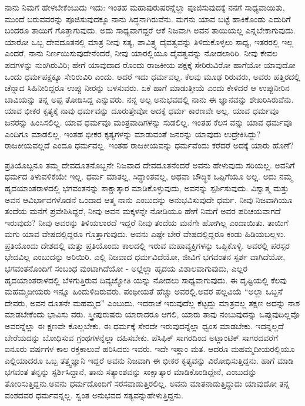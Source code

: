 ನಾನು ನಿಮಗೆ ಹೇಳಬೇಕೆಂಬುದು ಇದು: ಇಂತಹ ಮಹಾಪುರುಷರನ್ನೆಲ್ಲಾ ಪೂಜಿಸುವುದಕ್ಕೆ ನನಗೆ ಸಾಧ್ಯವಾಯಿತು, ಮುಂದೆ ಬರುವವರನ್ನು ಪೂಜಿಸುವುದಕ್ಕೂ ನಾನು ಸಿದ್ಧನಾಗಿರುವೆನು. ಮಗನು ಯಾವ ಬಟ್ಟೆ ಹಾಕಿಕೊಂಡು ಎದುರಿಗೆ ಬಂದರೂ ತಾಯಿಗೆ ಗೊತ್ತಾಗುವುದು. ಅದು ಸಾಧ್ಯವಾಗದ್ದರೆ ಆಕೆ ನಿಜವಾಗಿ ಅವನ ತಾಯಿಯಲ್ಲ ಎನ್ನಬೇಕಾಗುವುದು. ಯಾರೋ ಒಬ್ಬ ದೇವದೂತನಲ್ಲಿ ಮಾತ್ರ ನೀವು ಸತ್ಯ, ಪಾವಿತ್ರ್ಯ ದೈವತ್ವವನ್ನು ತಿಳಿದುಕೊಳ್ಳಲು ಸಾಧ್ಯ, ಇತರರಲ್ಲಿ ಇಲ್ಲ ಎಂದರೆ, ನಾನು ನಿರ್ಣಯಿಸುವುದೇನೆಂದರೆ, ನೀವು ಯಾರಲ್ಲಿಯೂ ದೈವತ್ವವನ್ನು ನೋಡಲಾರಿರಿ. ನೀವು ಕೇವಲ ಪದಗಳನ್ನು ನುಂಗಿರುವಿರಿ; ಹೇಗೆ ಯಾವುದಾದ ರೊಂದು ರಾಜಕೀಯ ಪಕ್ಷಕ್ಕೆ ಸೇರಿರುವಿರೋ ಹಾಗೆಯೋ ಯಾವುದೋ ಒಂದು ಧರ್ಮಪಕ್ಷಕ್ಕೂ ಸೇರಿರುವಿರಿ ಎಂದು. ಆದರೆ ಇದು ಧರ್ಮವಲ್ಲ. ಕೆಲವು ಮೂಢ ರಿರುವರು, ಅವರು ಹತ್ತಿರದಲ್ಲಿ ಚೆನ್ನಾದ ಸಿಹಿನೀರಿದ್ದರೂ ಉಪ್ಪು ನೀರನ್ನು ಬಳಸುವರು. ಏಕೆ ಹಾಗೆ ಮಾಡುತ್ತೀಯೆ ಎಂದು ಕೇಳಿದರೆ ಆ ಉಪ್ಪುನೀರಿನ ಬಾವಿಯನ್ನು ತನ್ನ ಅಪ್ಪ ತೋಡಿಸಿದ್ದ ಎನ್ನುವರು. ನನ್ನ ಅಲ್ಪ ಅನುಭವದಲ್ಲಿ ನಾನು ಈ ಜ್ಞಾನವನ್ನು ಶೇಖರಿಸಿರುವೆನು. ಯಾವ ಭೀಕರ ಕೃತ್ಯಕ್ಕೆ ನಾವು ಧರ್ಮವನ್ನು ದೂರುತ್ತೇವೋ ಅದಕ್ಕೆ ಧರ್ಮ ಕಾರಣವೇ ಅಲ್ಲ. ಯಾವ ಧರ್ಮವೂ ಜನರನ್ನು ಹಿಂಸಿಸಲಿಲ್ಲ. ಯಾವ ಧರ್ಮವೂ ಮಂತ್ರವಾದಿಗಳನ್ನು ಸುಡಲಿಲ್ಲ. ಇಂತಹ ಕೆಲಸ ವನ್ನು ಯಾವ ಧರ್ಮವೂ ಎಂದಿಗೂ ಮಾಡಲಿಲ್ಲ. ಇಂತಹ ಭೀಕರ ಕೃತ್ಯಗಳನ್ನು ಮಾಡುವಂತೆ ಜನರನ್ನು ಯಾವುದು ಉದ್ರೇಕಿಸಿದ್ದು? ರಾಜಕೀಯವಲ್ಲದೆ ಎಂದೂ ಧರ್ಮವಲ್ಲ. ಇಂತಹ ರಾಜಕೀಯವನ್ನು ಧರ್ಮವೆಂದು ಕರೆದರೆ ಅದಕ್ಕೆ ಯಾರು ಹೊಣೆ?

ಪ್ರತಿಯೊಬ್ಬನೂ ತಮ್ಮ ದೇವದೂತನೊಬ್ಬನೇ ನಿಜವಾದ ದೇವದೂತನೆಂದರೆ ಅವನು ಹೇಳುವುದು ಸರಿಯಲ್ಲ. ಅವನಿಗೆ ಧರ್ಮದ ತಿಳುವಳಿಕೆಯೇ ಇಲ್ಲ. ಧರ್ಮ ಮಾತಲ್ಲ, ಸಿದ್ಧಾಂತವಲ್ಲ, ಅಥವಾ ಬೌದ್ಧಿಕ ಒಪ್ಪಿಗೆಯೂ ಅಲ್ಲ. ಅದು ನಮ್ಮ ಹೃದಯಾಂತರಾಳದಲ್ಲಿ ಭಗವಂತನನ್ನು ಸಾಕ್ಷಾತ್ಕಾರ ಮಾಡಿಕೊಳ್ಳುವುದು, ಅವನನ್ನು ಸ್ಪರ್ಶಿಸುವುದು. ವಿಶ್ವಾತ್ಮ ಮತ್ತು ಅವನ ಆವಿರ್ಭಾವಗಳೊಡನೆ ಒಂದಾದ ಆತ್ಮ ನಾನು ಎಂಬುದನ್ನು ಅನುಭವಿಸುವುದೇ ಧರ್ಮ. ನೀವು ನಿಜವಾಗಿಯೂ ತಂದೆಯ ಮನೆಗೆ ಪ್ರವೇಶಿಸಿದ್ದರೆ, ನೀವು ಅವನ ಮಕ್ಕಳನ್ನೇ ನೋಡಿಯೂ ಹೇಗೆ ನಿಮಗೆ ಅವರ ಪರಿಚಯವಾಗದೆ ಇರುವುದು? ನೀವು ಅವರನ್ನು ತಿಳಿಯಲಾರದೆ ಇದ್ದರೆ ನೀವು ತಂದೆಯ ಮನೆಗೇ ಹೋಗಿಲ್ಲ ಎಂದಾಯಿತು. ತಾಯಿಗೆ ಮಗು ಯಾವ ವೇಷದಲ್ಲಿದ್ದರೂ ಗೊತ್ತಾಗುವುದು. ಅವನು ಎಷ್ಟೇ ಬೇರೆ ವೇಷದಲ್ಲಿದ್ದರೂ ಕಂಡು ಹಿಡಿಯಬಲ್ಲಳು. ಪ್ರತಿಯೊಂದು ದೇಶದಲ್ಲಿ ಮತ್ತು ಪ್ರತಿಯೊಂದು ಕಾಲದಲ್ಲಿ ಇರುವ ಮಹಾವ್ಯಕ್ತಿಗಳನ್ನು ಒಪ್ಪಿಕೊಳ್ಳಿ. ಅವರಲ್ಲಿ ಪರಸ್ಪರ ಭೇದವಿಲ್ಲ ಎಂಬುದನ್ನು ಅರಿಯಿರಿ. ಎಲ್ಲಿ ನಿಜವಾದ ಧರ್ಮವಿದೆಯೋ, ಜೀವಿಗೆ ಭಗವಂತನ ಸ್ಪರ್ಶ ವಾಗಿದೆಯೋ, ಭಗವಂತನೊಂದಿಗೆ ಸಂಬಂಧ ವುಂಟಾಗಿದೆಯೋ - ಅಲ್ಲೆಲ್ಲಾ ಹೃದಯ ವಿಶಾಲವಾಗುವುದು, ಎಲ್ಲರ ಹೃದಯಾಂತರಾಳದಲ್ಲಿ ಬೆಳಗುತ್ತಿರುವ ದಿವ್ಯಜ್ಯೋತಿ ಯನ್ನು ನೋಡಲು ಸಾಧ್ಯವಾಗುವುದು. ಈ ದೃಷ್ಟಿಯಲ್ಲಿ ಕೆಲವು ಮಹಮ್ಮದೀಯರು ಇನ್ನೂ ಹಿಂದುಳಿದಿರುವರು. ಪಂಥೀಯತೆ ಹೆಚ್ಚು ಅವರಲ್ಲಿ.ಅವರ ಪಲ್ಲವಿಯೆ “ಅಲ್ಲಾ ಒಬ್ಬನೆ ದೇವರು, ಅವನ ದೂತನೇ ಮಹಮ್ಮದ” ಎಂಬುದು. ಇದರಾಚೆ ಇರುವುದೆಲ್ಲ ಕೆಟ್ಟದ್ದು ಮಾತ್ರವಲ್ಲ ತಕ್ಷಣ ಅದನ್ನು ನಾಶ ಮಾಡಬೇಕೆಂದು ಭಾವಿಸು ವರು. ಸ್ತ್ರೀಪುರುಷರು ಯಾರಾದರೂ ಆಗಲಿ, ಯಾರು ತಾವು ನಂಬುವುದನ್ನು ಒಪ್ಪುವುದಿಲ್ಲವೊ ಅವರನ್ನೆಲ್ಲಾ ಈ ಕ್ಷಣವೇ ಕೊಲ್ಲಬೇಕು. ಈ ಧರ್ಮಕ್ಕೆ ಸೇರದೇ ಇರುವುದನ್ನೆಲ್ಲಾ ಧ್ವಂಸ ಮಾಡಬೇಕು. ಇದನ್ನಲ್ಲದೆ ಬೇರೆಯದನ್ನು ಬೋಧಿಸುವ ಗ್ರಂಥಗಳನ್ನೆಲ್ಲಾ ದಹಿಸಬೇಕು. ಪೆಸಿಫಿಕ್​ ಸಾಗರದಿಂದ ಅಟ್ಲಾಂಟಿಕ್​ ಸಾಗರದವರೆಗೆ ಐನೂರು ವರ್ಷಗಳ ಕಾಲ ರಕ್ತಕಾಲುವೆ ಹರಿಸಿದರು ಇವರು. ಇದೇ ಇಸ್ಲಾಂ ಮತ. ಆದರೂ ಮಹಮ್ಮದೀಯರಲ್ಲಿಯೂ ಎಲ್ಲಿಯಾದರೂ ಒಬ್ಬ ತತ್ತ್ವಜ್ಞಾನಿ ಇದ್ದರೆ ಅವನು ನಿಜವಾಗಿ ಈ ಭೀಕರ ಕೃತ್ಯವನ್ನು ವಿರೋಧಿಸುತ್ತಿದ್ದನು. ಹಾಗೆ ಮಾಡಿ ಭಗವಂತ ತನ್ನನ್ನು ಸ್ಪರ್ಶಿಸಿದ್ದಾನೆ, ತಾನು ಸತ್ಯಾಂಶವನ್ನು ಸಾಕ್ಷಾತ್ಕಾರ ಮಾಡಿಕೊಂಡಿದ್ದೇನೆ, ಎಂಬುದನ್ನು ತೋರಿಸುತ್ತಿದ್ದನು.ಅವನು ಧರ್ಮದೊಂದಿಗೆ ಸರಸವಾಡುತ್ತಿರಲಿಲ್ಲ. ಅವನು ಮಾತನಾಡುತ್ತಿದ್ದುದು ಯಾವುದೋ ತನ್ನ ವಂಶದವರ ಧರ್ಮವನ್ನಲ್ಲ. ಸ್ವಂತ ಅನುಭವದ ಸತ್ಯವನ್ನುಹೇಳುತ್ತಿದ್ದನು.

